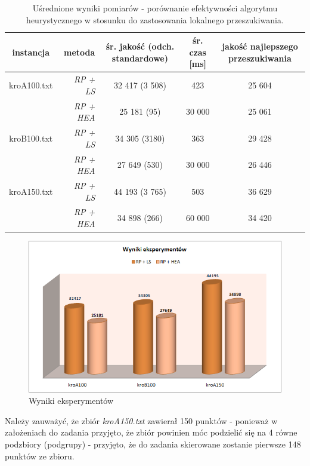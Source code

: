 \documentclass{article}
\begin{document}
\begin{table}[h!]
\begin{center}
\centering
  \begin{tabular}{| c | D | S | c | S | }
\hline
	instancja & metoda & śr. jakość (odch. standardowe) & śr. czas [ms] & jakość najlepszego przeszukiwania \\ \hline
    kroA100.txt & \emph{RP + LS} & 32 417 (3 508) & 423 & 25 604 \\
     & \emph{RP + HEA} & 25 181 (95) & 30 000 & 25 061 \\
\hline
    kroB100.txt & \emph{RP + LS} & 34 305 (3180) & 363 & 29 428 \\
     & \emph{RP + HEA} & 27 649 (530) & 30 000 & 26 446 \\
\hline
    kroA150.txt & \emph{RP + LS} & 44 193 (3 765) & 503 & 36 629 \\
     & \emph{RP + HEA} & 34 898 (266) & 60 000 & 34 420 \\
\hline
  \end{tabular}
\end{center}
\caption{Uśrednione wyniki pomiarów - porównanie efektywności algorytmu heurystycznego w stosunku do zastosowania lokalnego przeszukiwania.} \label{tab:wynikils}
\end{table}

\begin{figure}[h!]
\centering\includegraphics[width=17cm]{img/wyk1.png}
\caption{Wyniki eksperymentów}
\label{wyk:wyniki}
\end{figure}

Należy zauważyć, że zbiór \emph{kroA150.txt} zawierał 150 punktów - ponieważ w założeniach do zadania przyjęto, że zbiór powinien móc podzielić się na 4 równe podzbiory (podgrupy) - przyjęto, że do zadania skierowane zostanie pierwsze 148 punktów ze zbioru.
\end{document}

